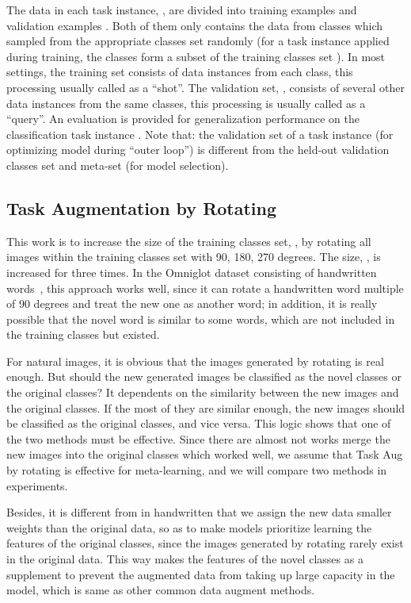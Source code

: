 \documentclass[10pt,twocolumn,letterpaper]{article}
\begin{document}
The data in each task instance, , are divided into training examples  and validation examples . Both of them only contains the data from  classes which sampled from the appropriate classes set randomly (for a task instance applied during training, the classes form a subset of the training classes set ). In most settings, the training set  consists of  data instances from each class, this processing usually called as a ``shot''. The validation set, , consists of several other data instances from the same classes, this processing is usually called as a ``query''. An evaluation is provided for generalization performance on the  classification task instance . Note that: the validation set of a task instance  (for optimizing model during ``outer loop'') is different from the held-out validation classes set  and meta-set  (for model selection).


\subsection{Task Augmentation by Rotating}
This work is to increase the size of the training classes set, , by rotating all images within the training classes set with 90, 180, 270 degrees. The size, , is increased for three times. In the Omniglot dataset consisting of handwritten words~\cite{santoro2016meta}, this approach works well, since it can rotate a handwritten word multiple of 90 degrees and treat the new one as another word; in addition, it is really possible that the novel word is similar to some words, which are not included in the training classes but existed. 

For natural images, it is obvious that the images generated by rotating is real enough. But should the new generated images be classified as the novel classes or the original classes? It dependents on the similarity between the new images and the original classes. If the most of they are similar enough, the new images should be classified as the original classes, and vice versa. This logic shows that one of the two methods must be effective. Since there are almost not works merge the new images into the original classes which worked well, we assume that Task Aug by rotating is effective for meta-learning, and we will compare two methods in experiments.





Besides, it is different from in handwritten that we assign the new data smaller weights than the original data, so as to make models prioritize learning the features of the original classes, since the images generated by rotating rarely exist in the original data. This way makes the features of the novel classes as a supplement to prevent the augmented data from taking up large capacity in the model, which is same as other common data augment methods.
\end{document}
